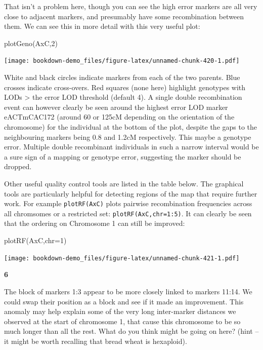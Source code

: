 \documentclass[
]{book}
\makeatletter
\newenvironment{Shaded}{\begin{snugshade}}{\end{snugshade}}
\newcommand{\AttributeTok}[1]{\textcolor[rgb]{0.77,0.63,0.00}{#1}}
\newcommand{\DecValTok}[1]{\textcolor[rgb]{0.00,0.00,0.81}{#1}}
\newcommand{\FunctionTok}[1]{\textcolor[rgb]{0.00,0.00,0.00}{#1}}
\newcommand{\NormalTok}[1]{#1}
\newenvironment{kframe}{%
\medskip{}
\setlength{\fboxsep}{.8em}
 \def\at@end@of@kframe{}%
 \ifinner\ifhmode%
  \def\at@end@of@kframe{\end{minipage}}%
  \begin{minipage}{\columnwidth}%
 \fi\fi%
 \def\FrameCommand##1{\hskip\@totalleftmargin \hskip-\fboxsep
 \colorbox{shadecolor}{##1}\hskip-\fboxsep
     \hskip-\linewidth \hskip-\@totalleftmargin \hskip\columnwidth}%
 \MakeFramed {\advance\hsize-\width
   \@totalleftmargin\z@ \linewidth\hsize
   \@setminipage}}%
 {\par\unskip\endMakeFramed%
 \at@end@of@kframe}
\newenvironment{rmdblock}[1]
  {
  \begin{itemize}
  \renewcommand{\labelitemi}{
    \raisebox{-.7\height}[0pt][0pt]{
      {\setkeys{Gin}{width=3em,keepaspectratio}\texttt{[image: images/\#1]}}
    }
  }
  \setlength{\fboxsep}{1em}
  \begin{kframe}
  \item
  }
  {
  \end{kframe}
  \end{itemize}
  }
\newenvironment{rmdquiz}
  {\begin{rmdblock}{quiz}}
  {\end{rmdblock}}
\makeatother
\begin{document}
That isn't a problem here, though you can see the high error markers are all very close to adjacent markers, and presumably have some recombination between them. We can see this in more detail with this very useful plot:

\begin{Shaded}
\begin{Highlighting}[]
\FunctionTok{plotGeno}\NormalTok{(AxC,}\DecValTok{2}\NormalTok{)}
\end{Highlighting}
\end{Shaded}

\texttt{[image: bookdown-demo\_files/figure-latex/unnamed-chunk-420-1.pdf]}

White and black circles indicate markers from each of the two parents. Blue crosses indicate cross-overs. Red squares (none here) highlight genotypes with LODs \textgreater{} the error LOD threshold (default 4). A single double recombination event can however clearly be seen around the highest error LOD marker eACTmCAC172 (around 60 or 125cM depending on the orientation of the chromosome) for the individual at the bottom of the plot, despite the gaps to the neighbouring markers being 0.8 and 1.2cM respectively. This maybe a genotype error. Multiple double recombinant individuals in such a narrow interval would be a sure sign of a mapping or genotype error, suggesting the marker should be dropped.

Other useful quality control tools are listed in the table below. The graphical tools are particularly helpful for detecting regions of the map that require further work. For example \texttt{plotRF(AxC)} plots pairwise recombination frequencies across all chromsomes or a restricted set: \texttt{plotRF(AxC,chr=1:5)}. It can clearly be seen that the ordering on Chromosome 1 can still be improved:

\begin{Shaded}
\begin{Highlighting}[]
\FunctionTok{plotRF}\NormalTok{(AxC,}\AttributeTok{chr=}\DecValTok{1}\NormalTok{)}
\end{Highlighting}
\end{Shaded}

\texttt{[image: bookdown-demo\_files/figure-latex/unnamed-chunk-421-1.pdf]}

\begin{rmdquiz}
\textbf{6}

The block of markers 1:3 appear to be more closely linked to markers 11:14. We could swap their position as a block and see if it made an improvement. This anomaly may help explain some of the very long inter-marker distances we observed at the start of chromosome 1, that cause this chromosome to be so much longer than all the rest. What do you think might be going on here? (hint -- it might be worth recalling that bread wheat is hexaploid).
\end{rmdquiz}
\end{document}
